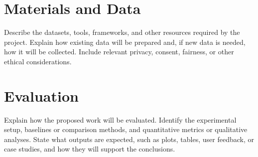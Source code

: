 \documentclass{article}
\begin{document}
\section{Materials and Data}
\label{sec:materials-data}

Describe the datasets, tools, frameworks, and other resources required by the
project. Explain how existing data will be prepared and, if new data is
needed, how it will be collected. Include relevant privacy, consent, fairness,
or other ethical considerations.

\section{Evaluation}
\label{sec:evaluation}

Explain how the proposed work will be evaluated. Identify the experimental
setup, baselines or comparison methods, and quantitative metrics or
qualitative analyses. State what outputs are expected, such as plots, tables,
user feedback, or case studies, and how they will support the conclusions.



\end{document}
